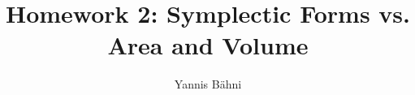 

\title{Homework 2: Symplectic Forms vs. Area and Volume}
\author{Yannis B\"ahni}
\address[Yannis B\"ahni]{University of Zurich, R\"amistrasse 71, 8006 Zurich}



\maketitle
\thispagestyle{fancy}
\setcounter{section}{1}

\begin{exercise}
\end{exercise}

\begin{solution}

\end{solution}

